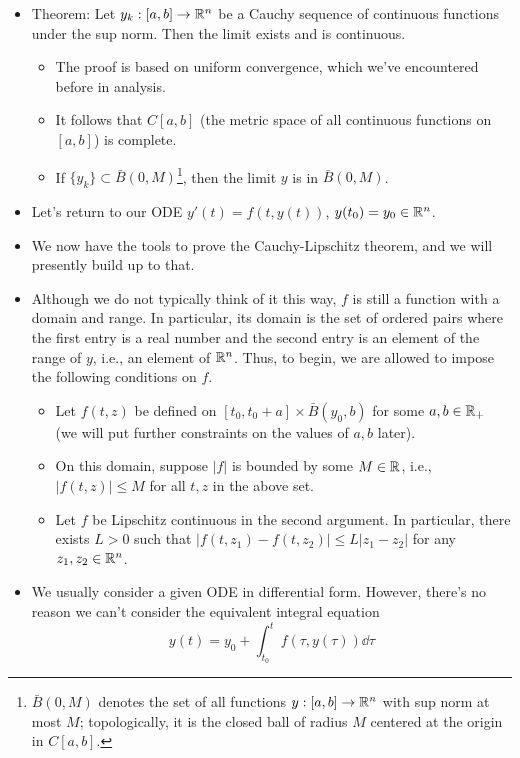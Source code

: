 \documentclass[../notes.tex]{subfiles}
\begin{document}
\begin{itemize}
\begin{itemize}
    \end{itemize}
    \item Theorem: Let $y_k:[a,b]\to\mathbb{R}^n$ be a Cauchy sequence of continuous functions under the sup norm. Then the limit exists and is continuous.
    \begin{itemize}
        \item The proof is based on uniform convergence, which we've encountered before in analysis.
        \item It follows that $C[a,b]$ (the metric space of all continuous functions on $[a,b]$) is complete.
        \item If $\{y_k\}\subset\bar{B}(0,M)$\footnote{$\bar{B}(0,M)$ denotes the set of all functions $y:[a,b]\to\mathbb{R}^n$ with sup norm at most $M$; topologically, it is the closed ball of radius $M$ centered at the origin in $C[a,b]$.}, then the limit $y$ is in $\bar{B}(0,M)$.
    \end{itemize}
    \item Let's return to our ODE $y'(t)=f(t,y(t))$, $y(t_0)=y_0\in\mathbb{R}^n$.
    \item We now have the tools to prove the Cauchy-Lipschitz theorem, and we will presently build up to that.
    \item Although we do not typically think of it this way, $f$ is still a function with a domain and range. In particular, its domain is the set of ordered pairs where the first entry is a real number and the second entry is an element of the range of $y$, i.e., an element of $\mathbb{R}^n$. Thus, to begin, we are allowed to impose the following conditions on $f$.
    \begin{itemize}
        \item Let $f(t,z)$ be defined on $[t_0,t_0+a]\times\bar{B}(y_0,b)$ for some $a,b\in\mathbb{R}_+$ (we will put further constraints on the values of $a,b$ later).
        \item On this domain, suppose $|f|$ is bounded by some $M\in\mathbb{R}$, i.e., $|f(t,z)|\leq M$ for all $t,z$ in the above set.
        \item Let $f$ be Lipschitz continuous in the second argument. In particular, there exists $L>0$ such that $|f(t,z_1)-f(t,z_2)|\leq L|z_1-z_2|$ for any $z_1,z_2\in\mathbb{R}^n$.
    \end{itemize}
    \item We usually consider a given ODE in differential form. However, there's no reason we can't consider the equivalent integral equation
    \begin{equation*}
        y(t) = y_0+\int_{t_0}^tf(\tau,y(\tau))\dd\tau

\end{equation*}
\end{itemize}
\end{document}
